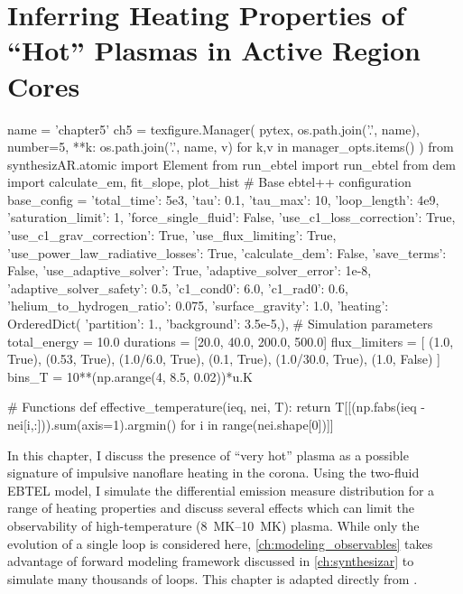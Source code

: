 \chapter{Inferring Heating Properties of ``Hot'' Plasmas in Active Region Cores}\label{ch:inferring_hot_plasma}

\begin{pycode}[chapter5]
name = 'chapter5'
ch5 = texfigure.Manager(
    pytex,
    os.path.join('.', name),
    number=5,
    **{k: os.path.join('.', name, v) for k,v in manager_opts.items()}
)
from synthesizAR.atomic import Element
from run_ebtel import run_ebtel
from dem import calculate_em, fit_slope, plot_hist
# Base ebtel++ configuration
base_config = {
    'total_time': 5e3,
    'tau': 0.1,
    'tau_max': 10,
    'loop_length': 4e9,
    'saturation_limit': 1,
    'force_single_fluid': False,
    'use_c1_loss_correction': True,
    'use_c1_grav_correction': True,
    'use_flux_limiting': True,
    'use_power_law_radiative_losses': True,
    'calculate_dem': False,
    'save_terms': False,
    'use_adaptive_solver': True,
    'adaptive_solver_error': 1e-8,
    'adaptive_solver_safety': 0.5,
    'c1_cond0': 6.0,
    'c1_rad0': 0.6,
    'helium_to_hydrogen_ratio': 0.075,
    'surface_gravity': 1.0,
    'heating': OrderedDict({
        'partition': 1.,
        'background': 3.5e-5,}),
}
# Simulation parameters
total_energy = 10.0
durations = [20.0, 40.0, 200.0, 500.0]
flux_limiters = [
    (1.0, True),
    (0.53, True),
    (1.0/6.0, True),
    (0.1, True),
    (1.0/30.0, True),
    (1.0, False)
]
bins_T = 10**(np.arange(4, 8.5, 0.02))*u.K

# Functions
def effective_temperature(ieq, nei, T):
    return T[[(np.fabs(ieq - nei[i,:])).sum(axis=1).argmin() for i in range(nei.shape[0])]]
\end{pycode}


In this chapter, I discuss the presence of ``very hot'' plasma as a possible signature of impulsive nanoflare heating in the corona. Using the two-fluid EBTEL model, I simulate the differential emission measure distribution for a range of heating properties and discuss several effects which can limit the observability of high-temperature (\SIrange{8}{10}{\mega\kelvin}) plasma. While only the evolution of a single loop is considered here, \autoref{ch:modeling_observables} takes advantage of forward modeling framework discussed in \autoref{ch:synthesizar} to simulate many thousands of loops. This chapter is adapted directly from \citet{barnes_inference_2016}.

